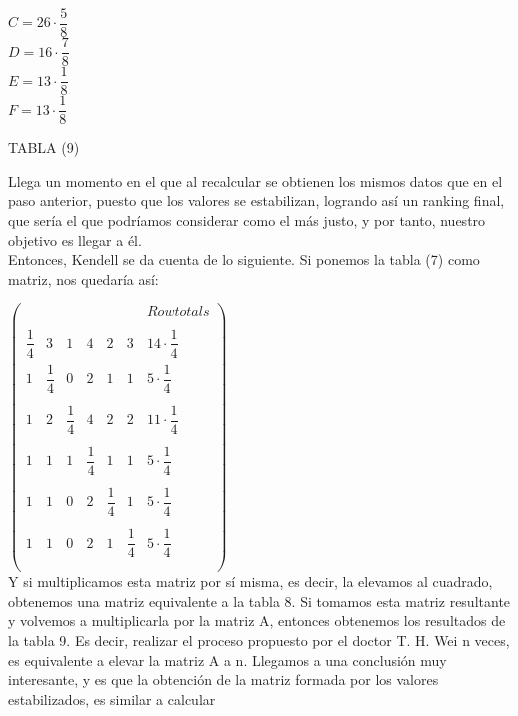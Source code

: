 \documentclass[a4paper]{article}
\begin{document}
$
C= 26\cdot\dfrac{5}{8}
$\\

$
D= 16\cdot\dfrac{7}{8}
$\\

$
E = 13\cdot\dfrac{1}{8}
$\\

$
F= 13\cdot\dfrac{1}{8}
$\\
	
	\begin{center}
TABLA (9)
\end{center}
	Llega un momento en el que al recalcular se obtienen los mismos datos que en el paso anterior, puesto que los valores se estabilizan, logrando así un ranking final, que sería el que podríamos considerar como el más justo, y por tanto, nuestro objetivo es llegar a él.\\
	
	Entonces, Kendell se da cuenta de lo siguiente. Si ponemos la tabla (7) como matriz, nos quedaría así:
	
	\hspace{3cm}$\begin{pmatrix}
     &  &  &  &  &   & Row totals\\ \\
   \dfrac{1}{4} & 3 & 1 & 4 & 2 & 3 & 14\cdot\dfrac{1}{4}\\
   1 & \dfrac{1}{4} & 0 & 2 & 1 & 1 & 5\cdot\dfrac{1}{4} \\\\
   1 & 2 & \dfrac{1}{4} & 4 & 2 & 2 & 11\cdot\dfrac{1}{4}\\\\
   1 & 1 & 1 & \dfrac{1}{4} & 1 & 1 & 5\cdot\dfrac{1}{4}\\\\
   1 & 1 & 0 & 2 & \dfrac{1}{4} & 1 & 5\cdot\dfrac{1}{4}\\\\
   1 & 1 & 0 & 2 & 1 & \dfrac{1}{4} & 5\cdot\dfrac{1}{4}\\\\
\end{pmatrix}$\\
	
	Y si multiplicamos esta matriz por sí misma, es decir, la elevamos al cuadrado, obtenemos una matriz equivalente a la tabla 8. Si tomamos esta matriz resultante y volvemos a multiplicarla por la matriz A, entonces obtenemos los resultados de la tabla 9. Es decir, realizar el proceso propuesto por el doctor T. H. Wei n veces, es equivalente a elevar la matriz A a n. Llegamos a una conclusión muy interesante, y es que la obtención de la matriz formada por los valores estabilizados, es similar a calcular \\
	
\end{document}
